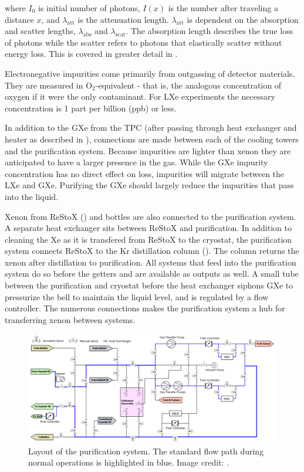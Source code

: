 \noindent where $I_0$ is initial number of photons, $I(x)$ is the number after traveling a distance $x$, and $\lambda_{\mathrm{att}}$ is
the
attenuation length.  $\lambda_{\mathrm{att}}$ is dependent on the absorption and scatter lengths, $\lambda_{\mathrm{abs}}$ and
$\lambda_{\mathrm{scat}}$.  The absorption length describes the true loss of photons while the scatter refers to photons that elastically
scatter without energy loss.  This is covered in greater detail in .

Electronegative impurities come primarily from outgassing of detector materials.  They are measured in O$_2$-equivalent - that is, the
analogous concentration of oxygen if it
were the only contaminant.  For LXe experiments the necessary concentration is 1 part per billion (ppb) or less.

In addition
to the GXe from the TPC (after passing through heat exchanger and heater as described in ), connections are
made between
each of the cooling towers and the purification system.  Because impurities are lighter than xenon they are anticipated to have a larger
presence in the gas.  While the GXe impurity concentration has no direct effect on \electron loss, impurities will migrate between the
LXe and GXe.  Purifying the GXe should largely reduce the impurities that pass into the liquid.

Xenon from ReStoX  () and bottles are also connected to the purification system.  A separate heat exchanger
sits between ReStoX and purification.  In
addition to cleaning the Xe as it is transfered from ReStoX to the cryostat, the purification system connects ReStoX to the Kr
distillation column ().  The column returns the xenon after distillation to purification.  All systems that
feed into the purification system do so before the getters and are available as outputs as well.  A small tube between the purification
and cryostat before the heat exchanger siphons GXe to pressurize the bell to maintain the liquid level, and is regulated by a flow
controller.  The numerous connections makes the purification system a hub for transferring xenon between systems.

\begin{figure}
\centering
\includegraphics[width=\textwidth]{PurificationLayout}
\caption{Layout of the purification system.  The standard flow path during normal operations is highlighted in blue.  Image credit:
.}
\label{fig:xenon1t_pur_schematic}
\end{figure}

